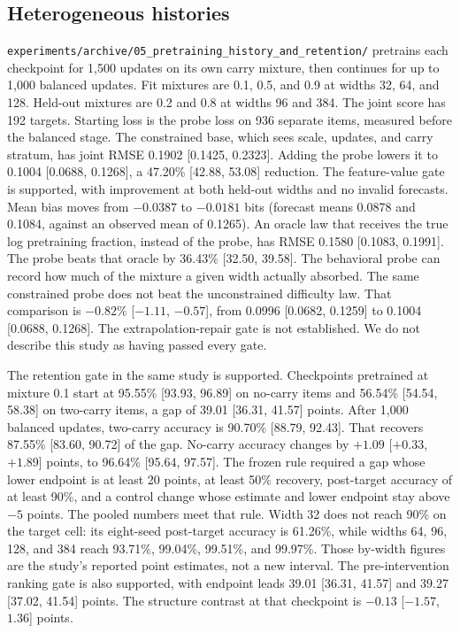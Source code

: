 \subsection{Heterogeneous histories}
\label{sec:exp05}
\texttt{experiments/archive/05\_pretraining\_history\_and\_retention/} pretrains each checkpoint for 1{,}500 updates on its own carry mixture, then continues for up to 1{,}000 balanced updates.
Fit mixtures are 0.1, 0.5, and 0.9 at widths 32, 64, and 128.
Held-out mixtures are 0.2 and 0.8 at widths 96 and 384.
The joint score has 192 targets.
Starting loss is the probe loss on 936 separate items, measured before the balanced stage.
The constrained base, which sees scale, updates, and carry stratum, has joint RMSE 0.1902 [0.1425, 0.2323].
Adding the probe lowers it to 0.1004 [0.0688, 0.1268], a 47.20\% [42.88, 53.08] reduction.
The feature-value gate is supported, with improvement at both held-out widths and no invalid forecasts.
Mean bias moves from $-0.0387$ to $-0.0181$ bits (forecast means 0.0878 and 0.1084, against an observed mean of 0.1265).
An oracle law that receives the true log pretraining fraction, instead of the probe, has RMSE 0.1580 [0.1083, 0.1991].
The probe beats that oracle by 36.43\% [32.50, 39.58].
The behavioral probe can record how much of the mixture a given width actually absorbed.
The same constrained probe does not beat the unconstrained difficulty law.
That comparison is $-0.82\%$ [$-1.11$, $-0.57$], from 0.0996 [0.0682, 0.1259] to 0.1004 [0.0688, 0.1268].
The extrapolation-repair gate is not established.
We do not describe this study as having passed every gate.

The retention gate in the same study is supported.
Checkpoints pretrained at mixture 0.1 start at 95.55\% [93.93, 96.89] on no-carry items and 56.54\% [54.54, 58.38] on two-carry items, a gap of 39.01 [36.31, 41.57] points.
After 1{,}000 balanced updates, two-carry accuracy is 90.70\% [88.79, 92.43].
That recovers 87.55\% [83.60, 90.72] of the gap.
No-carry accuracy changes by $+1.09$ [$+0.33$, $+1.89$] points, to 96.64\% [95.64, 97.57].
The frozen rule required a gap whose lower endpoint is at least 20 points, at least 50\% recovery, post-target accuracy of at least 90\%, and a control change whose estimate and lower endpoint stay above $-5$ points.
The pooled numbers meet that rule.
Width 32 does not reach 90\% on the target cell: its eight-seed post-target accuracy is 61.26\%, while widths 64, 96, 128, and 384 reach 93.71\%, 99.04\%, 99.51\%, and 99.97\%.
Those by-width figures are the study's reported point estimates, not a new interval.
The pre-intervention ranking gate is also supported, with endpoint leads 39.01 [36.31, 41.57] and 39.27 [37.02, 41.54] points.
The structure contrast at that checkpoint is $-0.13$ [$-1.57$, $1.36$] points.
